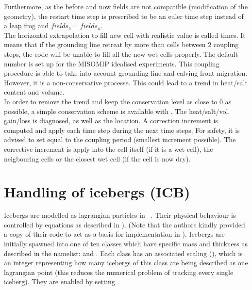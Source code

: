 \documentclass[../main/NEMO_manual]{subfiles}
\begin{document}
Furthermore, as the before and now fields are not compatible (modification of the geometry),
the restart time step is prescribed to be an euler time step instead of a leap frog and $fields_b = fields_n$.\\

The horizontal extrapolation to fill new cell with realistic value is called  times.
It means that if the grounding line retreat by more than  cells between 2 coupling steps,
the code will be unable to fill all the new wet cells properly.
The default number is set up for the MISOMIP idealised experiments.
This coupling procedure is able to take into account grounding line and calving front migration.
However, it is a non-conservative processe.
This could lead to a trend in heat/salt content and volume.\\

In order to remove the trend and keep the conservation level as close to 0 as possible,
a simple conservation scheme is available with .
The heat/salt/vol. gain/loss is diagnosed, as well as the location.
A correction increment is computed and apply each time step during the next  time steps.
For safety, it is advised to set  equal to the coupling period (smallest increment possible).
The corrective increment is apply into the cell itself (if it is a wet cell), the neigbouring cells or the closest wet cell (if the cell is now dry).

\section{Handling of icebergs (ICB)}
\label{sec:SBC_ICB_icebergs}

\begin{listing}
  \caption{}
  \label{lst:namberg}
\end{listing}

Icebergs are modelled as lagrangian particles in \NEMO\ \citep{marsh.ivchenko.ea_GMD15}.
Their physical behaviour is controlled by equations as described in \citet{martin.adcroft_OM10} ).
(Note that the authors kindly provided a copy of their code to act as a basis for implementation in \NEMO).
Icebergs are initially spawned into one of ten classes which have specific mass and thickness as
described in the  namelist:  and .
Each class has an associated scaling (),
which is an integer representing how many icebergs of this class are being described as one lagrangian point
(this reduces the numerical problem of tracking every single iceberg).
They are enabled by setting .
\end{document}
